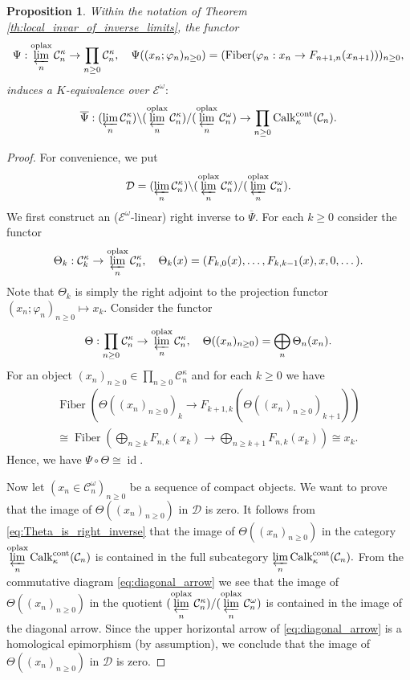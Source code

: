 \documentclass[11pt,leqno]{amsart}
\newtheorem{prop}[theo]{Proposition}
\numberwithin{equation}{section}
\newcommand{\prolim}[1][]{\mathop{\varprojlim}\limits_{#1}}
\newcommand{\biggplus}[1][]{\mathop{\bigoplus}\limits_{#1}}
\newcommand{\prodd}[1][]{\mathop{\prod}\limits_{#1}}
\newcommand{\bbar}{\overline}
\newcommand{\oplax}{\operatorname{oplax}}
\newcommand{\Fiber}{\operatorname{Fiber}}
\newcommand{\cont}{\operatorname{cont}}
\newcommand{\cD}{{\mathcal D}}
\newcommand{\cC}{{\mathcal C}}
\newcommand{\cE}{{\mathcal E}}
\newcommand{\Calk}{\operatorname{Calk}}
\newcommand{\id}{\operatorname{id}}
\begin{document}
\begin{prop}\label{prop:double_quotient_K_equiv} Within the notation of Theorem \ref{th:local_invar_of_inverse_limits}, the functor 
\begin{equation*}
\Psi:\prolim[n]^{\oplax}\cC_n^{\kappa}\to \prodd[n\geq 0]\cC_n^{\kappa},\quad \Psi((x_n;\varphi_n)_{n\geq 0})=(\Fiber(\varphi_n:x_n\to F_{n+1,n}(x_{n+1})))_{n\geq 0},\end{equation*}
induces a $K$-equivalence over $\cE^{\omega}:$
\begin{equation*}
\bbar{\Psi}:(\prolim[n]\cC_n^{\kappa})\backslash(\prolim[n]^{\oplax}\cC_n^{\kappa})/(\prolim[n]^{\oplax}\cC_n^{\omega})\to \prodd[n\geq 0]\Calk_{\kappa}^{\cont}(\cC_n).
\end{equation*}\end{prop}
\begin{proof}
For convenience, we put $$\cD=(\prolim[n]\cC_n^{\kappa})\backslash(\prolim[n]^{\oplax}\cC_n^{\kappa})/(\prolim[n]^{\oplax}\cC_n^{\omega}).$$ We first construct an ($\cE^{\omega}$-linear) right inverse to $\bbar{\Psi}.$ For each $k\geq 0$ consider the functor
\begin{equation*}
\Theta_k:\cC_k^{\kappa}\to\prolim[n]^{\oplax}\cC_n^{\kappa},\quad \Theta_k(x)=(F_{k,0}(x),\dots,F_{k,k-1}(x),x,0,\dots).
\end{equation*}
Note that $\Theta_k$ is simply the right adjoint to the projection functor $(x_n;\varphi_n)_{n\geq 0}\mapsto x_k.$
 Consider the functor
\begin{equation*}
\Theta:\prodd[n\geq 0]\cC_n^{\kappa}\to\prolim[n]^{\oplax}\cC_n^{\kappa},\quad \Theta((x_n)_{n\geq 0})=\biggplus[n]\Theta_n(x_n).
\end{equation*}
For an object $(x_n)_{n\geq 0}\in\prodd[n\geq 0]\cC_n^{\kappa}$ and for each $k\geq 0$ we have
\begin{multline}
\label{eq:Theta_is_right_inverse}
\Fiber(\Theta((x_n)_{n\geq 0})_k\to F_{k+1,k}(\Theta((x_n)_{n\geq 0})_{k+1}))\\
\cong \Fiber(\biggplus[n\geq k]F_{n,k}(x_k)\to \biggplus[n\geq k+1]F_{n,k}(x_k))\cong  x_k.	
\end{multline}
Hence, we have $\Psi\circ\Theta\cong\id.$

Now let $(x_n\in\cC_n^{\omega})_{n\geq 0}$ be a sequence of compact objects. We want to prove that the image of $\Theta((x_n)_{n\geq 0})$ in $\cD$ is zero. It follows from \eqref{eq:Theta_is_right_inverse} that the image of $\Theta((x_n)_{n\geq 0})$ in the category $\prolim[n]^{\oplax}\Calk_{\kappa}^{\cont}(\cC_n)$ is contained in the full subcategory $\prolim[n]\Calk_{\kappa}^{\cont}(\cC_n).$ From the commutative diagram \eqref{eq:diagonal_arrow} we see that the image of $\Theta((x_n)_{n\geq 0})$ in the quotient $(\prolim[n]^{\oplax}\cC_n^{\kappa})/(\prolim[n]^{\oplax}\cC_n^{\omega})$ is contained in the image of the diagonal arrow. Since the upper horizontal arrow of \eqref{eq:diagonal_arrow} is a homological epimorphism (by assumption), we conclude that the image of $\Theta((x_n)_{n\geq 0})$ in $\cD$ is zero.


\end{proof}
\end{document}
